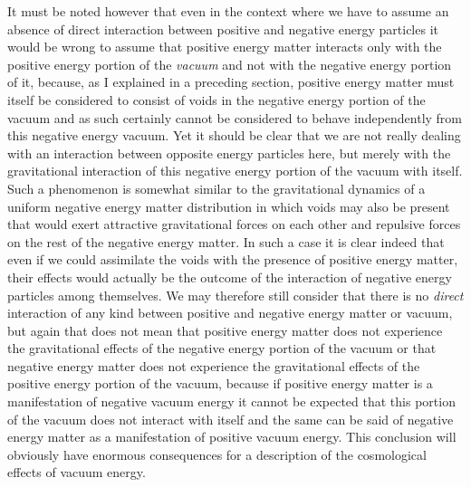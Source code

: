 \documentclass[notitlepage,12pt]{report}
\begin{document}
It must be noted however that even in the context where we have to assume an absence of direct interaction between positive and negative energy particles it would be wrong to assume that positive energy matter interacts only with the positive energy portion of the \textit{vacuum} and not with the negative energy portion of it, because, as I explained in a preceding section, positive energy matter must itself be considered to consist of voids in the negative energy portion of the vacuum and as such certainly cannot be considered to behave independently from this negative energy vacuum. Yet it should be clear that we are not really dealing with an interaction between opposite energy particles here, but merely with the gravitational interaction of this negative energy portion of the vacuum with itself. Such a phenomenon is somewhat similar to the gravitational dynamics of a uniform negative energy matter distribution in which voids may also be present that would exert attractive gravitational forces on each other and repulsive forces on the rest of the negative energy matter. In such a case it is clear indeed that even if we could assimilate the voids with the presence of positive energy matter, their effects would actually be the outcome of the interaction of negative energy particles among themselves. We may therefore still consider that there is no \textit{direct} interaction of any kind between positive and negative energy matter or vacuum, but again that does not mean that positive energy matter does not experience the gravitational effects of the negative energy portion of the vacuum or that negative energy matter does not experience the gravitational effects of the positive energy portion of the vacuum, because if positive energy matter is a manifestation of negative vacuum energy it cannot be expected that this portion of the vacuum does not interact with itself and the same can be said of negative energy matter as a manifestation of positive vacuum energy. This conclusion will obviously have enormous consequences for a description of the cosmological effects of vacuum energy.
\end{document}
